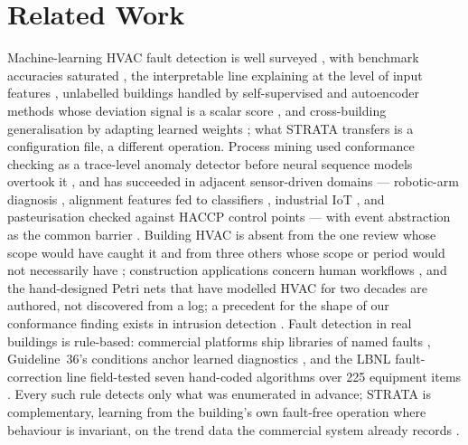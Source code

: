 \documentclass[11pt,letterpaper]{article}
\begin{document}
\section{Related Work}
\label{sec:related}

Machine-learning HVAC fault detection is well surveyed \cite{bi2024aihvacreview}, with benchmark accuracies saturated \cite{tun2021hybridrfsvm,prince2025improved1dcnnlstm}, the interpretable line explaining at the level of input features \cite{deng2024afgcn,wang2025xmhac}, unlabelled buildings handled by self-supervised and autoencoder methods whose deviation signal is a scalar score \cite{abdollah2024transformerssl,elmokhtari2024aebas}, and cross-building generalisation by adapting learned weights \cite{zhu2021chillertransfer,ghalamsiah2025canhvac}; what STRATA transfers is a configuration file, a different operation. Process mining \cite{vanderaalst2016processmining} used conformance checking as a trace-level anomaly detector \cite{bezerra2013anomalytraces,rozinat2008conformance} before neural sequence models overtook it \cite{nolle2022binet}, and has succeeded in adjacent sensor-driven domains --- robotic-arm diagnosis \cite{vitale2025roadcps}, alignment features fed to classifiers \cite{vitale2025kbsfeatures}, industrial IoT \cite{husom2026udava}, and pasteurisation checked against HACCP control points \cite{moradbeikie2025pasteurization} --- with event abstraction as the common barrier \cite{janssen2021sensoreventlog,vanzelst2021eventabstraction,moradbeikie2026sensor2eventlog}. Building HVAC is absent from the one review whose scope would have caught it \cite{brzychczy2025pmsensorreview} and from three others whose scope or period would not necessarily have \cite{bi2024aihvacreview,akhramovich2024pmindustry40,granderson2017fddtoolsurvey}; construction applications concern human workflows \cite{martinezlagunas2024constructionpm}, and the hand-designed Petri nets that have modelled HVAC for two decades \cite{villani2004hybridpetri,gomes2007petribas,xu2015chillerpetri,deabes2023fuzzyptn} are authored, not discovered from a log; a precedent for the shape of our conformance finding exists in intrusion detection \cite{zhong2022pmids}. Fault detection in real buildings is rule-based: commercial platforms ship libraries of named faults \cite{granderson2017fddtoolsurvey}, Guideline~36's conditions anchor learned diagnostics \cite{pradhan2021dbng36}, and the LBNL fault-correction line field-tested seven hand-coded algorithms over 225 equipment items \cite{pritoni2022faultcorrection}. Every such rule detects only what was enumerated in advance; STRATA is complementary, learning from the building's own fault-free operation where behaviour is invariant, on the trend data the commercial system already records \cite{granderson2020lbnlfdddata}.
\end{document}
